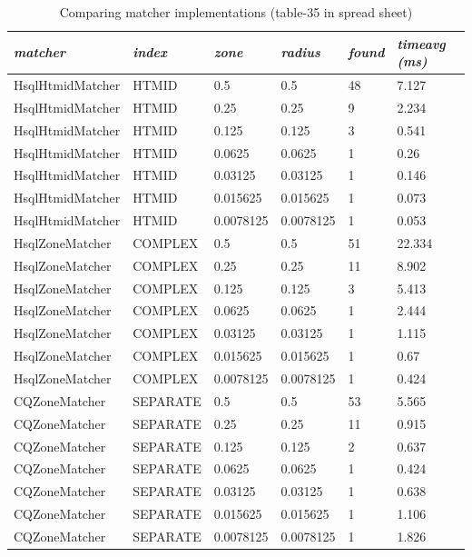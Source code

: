 \documentclass{article}
\begin{document}
\begin{table}[hbt!]
\centering
\begin{tabular}{|l|l|l|l|l|l|}
\hline
\textit{matcher} & \textit{index} & \textit{zone} & \textit{radius} & \textit{found} & \textit{timeavg (ms)} \\ \hline
HsqlHtmidMatcher & HTMID     & 0.5       & 0.5       & 48 &  7.127 \\ \hline
HsqlHtmidMatcher & HTMID     & 0.25      & 0.25      &  9 &  2.234 \\ \hline
HsqlHtmidMatcher & HTMID     & 0.125     & 0.125     &  3 &  0.541 \\ \hline
HsqlHtmidMatcher & HTMID     & 0.0625    & 0.0625    &  1 &  0.26 \\ \hline
HsqlHtmidMatcher & HTMID     & 0.03125   & 0.03125   &  1 &  0.146 \\ \hline
HsqlHtmidMatcher & HTMID     & 0.015625  & 0.015625  &  1 &  0.073 \\ \hline
HsqlHtmidMatcher & HTMID     & 0.0078125 & 0.0078125 &  1 &  0.053 \\ \hline
HsqlZoneMatcher  & COMPLEX   & 0.5       & 0.5       & 51 & 22.334 \\ \hline
HsqlZoneMatcher  & COMPLEX   & 0.25      & 0.25      & 11 &  8.902 \\ \hline
HsqlZoneMatcher  & COMPLEX   & 0.125     & 0.125     &  3 &  5.413 \\ \hline
HsqlZoneMatcher	 & COMPLEX   & 0.0625    & 0.0625    &  1 &  2.444 \\ \hline
HsqlZoneMatcher	 & COMPLEX   & 0.03125   & 0.03125   &  1 &  1.115 \\ \hline
HsqlZoneMatcher	 & COMPLEX   & 0.015625  & 0.015625  &  1 &  0.67 \\ \hline
HsqlZoneMatcher	 & COMPLEX   & 0.0078125 & 0.0078125 &  1 &  0.424 \\ \hline
CQZoneMatcher	 & SEPARATE  & 0.5       & 0.5       & 53 &  5.565 \\ \hline
CQZoneMatcher	 & SEPARATE  & 0.25      & 0.25      & 11 &  0.915 \\ \hline
CQZoneMatcher	 & SEPARATE  & 0.125     & 0.125     &  2 &  0.637 \\ \hline
CQZoneMatcher	 & SEPARATE  & 0.0625    & 0.0625    &  1 &  0.424 \\ \hline
CQZoneMatcher	 & SEPARATE  & 0.03125   & 0.03125   &  1 &  0.638 \\ \hline
CQZoneMatcher	 & SEPARATE  & 0.015625  & 0.015625  &  1 &  1.106 \\ \hline
CQZoneMatcher	 & SEPARATE  & 0.0078125 & 0.0078125 &  1 &  1.826 \\ \hline
\end{tabular}
\caption{Comparing matcher implementations (table-35 in spread sheet)}
\label{tab:matcher-comparison}
\end{table}
\end{document}
